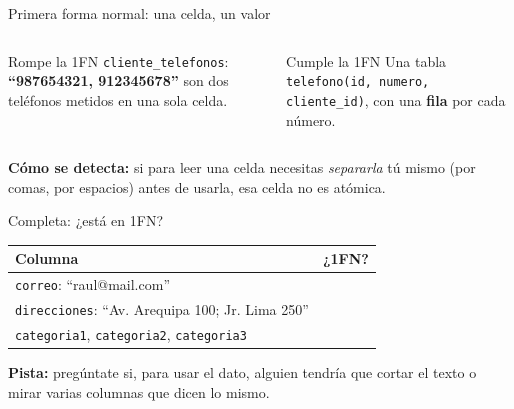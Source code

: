 \documentclass[aspectratio=169,10pt,c]{beamer}
\newcommand{\bl}[1][1.9cm]{\underline{\hspace{#1}}}
\newcommand{\fn}[1]{\tikz[baseline=-0.5ex]{\node[rounded corners=2pt,fill=utpRojo,text=white,
  font=\bfseries\small,inner xsep=6pt,inner ysep=3pt] {#1};}}
\newcommand{\tbl}[1]{\textcolor{utpNaranja}{\texttt{#1}}}
\begin{document}
\begin{frame}{\fn{1FN} Primera forma normal: una celda, un valor}
\vspace{0.25cm}
\begin{columns}[T,onlytextwidth]
\begin{alertblock}{Rompe la 1FN}
\small \texttt{cliente\_telefonos}: \textbf{``987654321, 912345678''} son dos teléfonos metidos en una sola celda.
\end{alertblock}
\begin{exampleblock}{Cumple la 1FN}
\small Una tabla \tbl{telefono}\texttt{(id, numero, cliente\_id)}, con una \textbf{fila} por cada número.
\end{exampleblock}
\end{columns}
\vspace{0.3cm}
\small \textbf{Cómo se detecta:} si para leer una celda necesitas \textit{separarla} tú mismo (por comas, por espacios) antes de usarla, esa celda no es atómica.
\vspace{0.2cm}
\end{frame}

\begin{frame}{Completa: ¿está en 1FN?}
\begin{center}
\small
\begin{tabular}{>{\raggedright\arraybackslash}p{9cm}p{2.4cm}}
\toprule
\bfseries Columna & \bfseries ¿1FN? \\
\midrule
\texttt{correo}: ``raul@mail.com'' & \bl[2cm] \\[8pt]
\texttt{direcciones}: ``Av. Arequipa 100; Jr. Lima 250'' & \bl[2cm] \\[8pt]
\texttt{categoria1}, \texttt{categoria2}, \texttt{categoria3} & \bl[2cm] \\
\bottomrule
\end{tabular}
\end{center}
\vspace{0.3cm}
\small \textbf{Pista:} pregúntate si, para usar el dato, alguien tendría que cortar el texto o mirar varias columnas que dicen lo mismo.
\end{frame}
\end{document}
